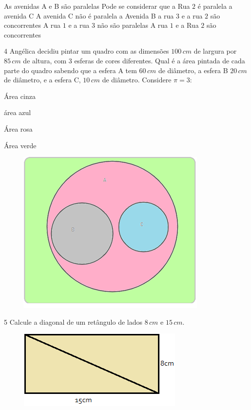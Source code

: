 \begin{boxlist}
 As avenidas A e B são paralelas
 Pode se considerar que a Rua $2$ é paralela a avenida C
 A avenida C não é paralela a Avenida B
 a rua $3$ e a rua $2$ são concorrentes
 A rua $1$ e a rua $3$ não são paralelas
 A rua $1$ e a Rua $2$ são concorrentes
\end{boxlist}

\num{4}  Angélica decidiu pintar um quadro com as dimensões $100\,cm$ de largura
por $85\,cm$ de altura, com $3$ esferas de cores diferentes. Qual é a área
pintada de cada parte do quadro sabendo que a esfera A tem $60\,cm$ de
diâmetro, a esfera B $20\,cm$ de diâmetro, e a esfera C, $10\,cm$ de diâmetro. Considere $π = 3$:


\begin{multicols}{2}
\begin{escolha}
\item Área cinza 
\item área azul 
\item Área rosa 
\item Área verde 
\end{escolha}
\end{multicols}

\begin{figure}[h]
\centering\includegraphics[width=3.70833in,height=3.22917in]{./imgSAEB_6_MAT/media/image54.png}
\end{figure}

\num{5}  Calcule a diagonal de um retângulo de lados $8\,cm$ e $15\,cm$.

\begin{figure}[h]
\centering\includegraphics[width=3.24444in,height=1.54653in]{./imgSAEB_6_MAT/media/image55.png}
\end{figure}

